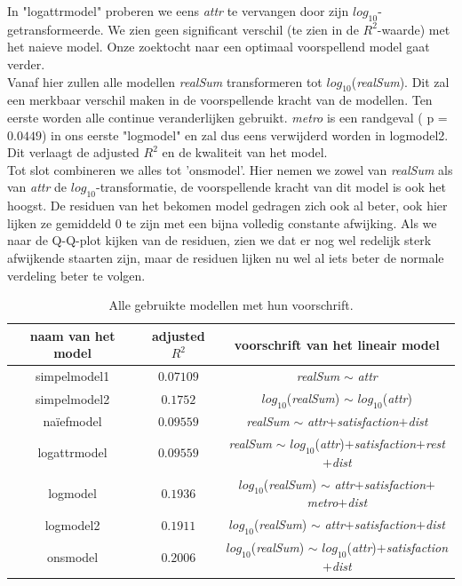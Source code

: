 \documentclass[a4paper]{kulakarticle}
\begin{document}
	In "logattrmodel" proberen we eens \textit{attr} te vervangen door zijn $log_{10}$-getransformeerde. We zien geen significant verschil (te zien in de $R^2$-waarde) met het naieve model. Onze zoektocht naar een optimaal voorspellend model gaat verder. \\
	Vanaf hier zullen alle modellen \textit{realSum} transformeren tot $log_{10}$(\textit{realSum}). Dit zal een merkbaar verschil maken in de voorspellende kracht van de modellen. Ten eerste worden alle continue veranderlijken gebruikt. \textit{metro} is een randgeval ( p = $0.0449$) in ons eerste "logmodel" en zal dus eens verwijderd worden in logmodel2. Dit verlaagt de adjusted $R^2$ en de kwaliteit van het model. \\
	
	Tot slot combineren we alles tot 'onsmodel'. Hier nemen we zowel van \textit{realSum} als van \textit{attr} de $log_{10}$-transformatie, de voorspellende kracht van dit model is ook het hoogst. De residuen van het bekomen model gedragen zich ook al beter, ook hier lijken ze gemiddeld 0 te zijn met een bijna volledig constante afwijking. Als we naar de Q-Q-plot kijken van de residuen, zien we dat er nog wel redelijk sterk afwijkende staarten zijn, maar de residuen lijken nu wel al iets beter de normale verdeling beter te volgen.  

	\begin{table}[h]
		\centering
		\begin{tabular}{c|c|c}
		\centering
		naam van het model & adjusted $R^2$ & voorschrift van het lineair model \\
		\hline
		 simpelmodel1 & $0.07109$ & \textit{realSum} $\sim$ \textit{attr}\\
		 simpelmodel2 &$0.1752$ & $log_{10}$(\textit{realSum}) $\sim$ $log_{10}$(\textit{attr}) \\
		naïefmodel & $0.09559$& \textit{realSum} $\sim$ \textit{attr}$+$\textit{satisfaction}$+$\textit{dist}\\
		 logattrmodel &$0.09559$ & \textit{realSum} $\sim$ $log_{10}$(\textit{attr})$+$\textit{satisfaction}$+$\textit{rest}$+$\textit{dist}\\
		 logmodel &$0.1936$ & $log_{10}$(\textit{realSum}) $\sim$ \textit{attr}$+$\textit{satisfaction}$+$\textit{metro}$+$\textit{dist}\\
		 logmodel2 &$0.1911$ & $log_{10}$(\textit{realSum}) $\sim$ \textit{attr}$+$\textit{satisfaction}$+$\textit{dist}\\
		  onsmodel &$0.2006$ & $log_{10}$(\textit{realSum}) $\sim$ $log_{10}$(\textit{attr})$+$\textit{satisfaction}$+$\textit{dist}\\
		\end{tabular}
		\caption{Alle gebruikte modellen met hun voorschrift.}
		\label{rsq}
	\end{table}
	
\end{document}
